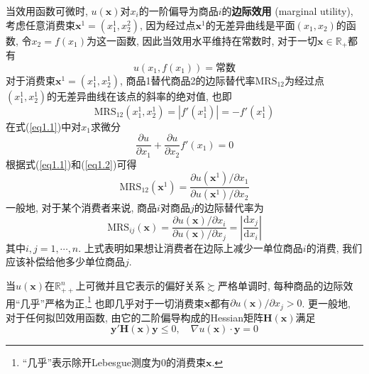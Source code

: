\documentclass[cn, 12pt, math=mtpro2, bibstyle=apa, blue]{elegantbook}
\newcommand{\R}{\mathbb{R}}
\newcommand{\x}{\mathbf{x}}
\begin{document}
当效用函数可微时, $u(\x)$对$x_i$的一阶偏导为商品$i$的\textbf{边际效用} (marginal utility), 考虑任意消费束$\x^1=(x^1_1,x^2_2)$, 因为经过点$\x^1$的无差异曲线是平面$(x_1,x_2)$的函数, 令$x_2=f(x_1)$为这一函数, 因此当效用水平维持在常数时, 对于一切$\x\in\R_+$都有
\begin{equation}\label{eq1.1}
  u(x_1,f(x_1))=\text{常数}
\end{equation}
对于消费束$\x^1=(x^1_1,x^1_2)$, 商品1替代商品2的边际替代率$\text{MRS}_{12}$为经过点$(x_1^1,x_2^1)$的无差异曲线在该点的斜率的绝对值, 也即
$$\text{MRS}_{12}(x_1^1,x_2^1)=|f'(x_1^1)|=-f'(x_1^1)$$
在式(\ref{eq1.1})中对$x_1$求微分
\begin{equation}\label{eq1.2}
  \frac{\partial u}{\partial x_1}+\frac{\partial u}{\partial x_2}f'(x_1)=0
\end{equation}
根据式(\ref{eq1.1})和(\ref{eq1.2})可得
$$\text{MRS}_{12}(\x^1)=\frac{\partial u(\x^1)/\partial x_1}{\partial u(\x^1)/\partial x_2}$$
一般地, 对于某个消费者来说, 商品$i$对商品$j$的边际替代率为
$$\text{MRS}_{ij}(\x)=\frac{\partial u(\x)/\partial x_i}{\partial u(\x)/\partial x_j}=\left|\frac{\text{d}x_j}{\text{d}x_i}\right|$$
其中$i,j=1,\cdots,n$. 上式表明如果想让消费者在边际上减少一单位商品$i$的消费, 我们应该补偿给他多少单位商品$j$.

当$u(\x)$在$\R^n_{++}$上可微并且它表示的偏好关系$\succsim$严格单调时, 每种商品的边际效用“几乎”严格为正,\footnote{“几乎”表示除开Lebesgue测度为0的消费束$\x$.} 也即几乎对于一切消费束$\x$都有$\partial u(\x)/\partial x_j>0$. 更一般地, 对于任何拟凹效用函数, 由它的二阶偏导构成的Hessian矩阵$\mathbf{H}(\x)$满足
$$\mathbf{y}'\mathbf{H}(\x)\mathbf{y}\le0,\quad \nabla u(\x)\cdot\mathbf{y}=0$$
\end{document}
